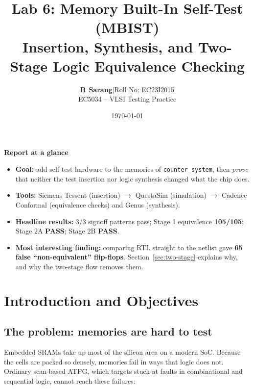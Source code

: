 \documentclass[11pt]{article}
\title{\vspace{-1em}\textbf{\color{navy}Lab 6: Memory Built-In Self-Test (MBIST)}\\[2pt]
\large Insertion, Synthesis, and Two-Stage Logic Equivalence Checking}
\author{\textbf{R Sarang}\quad|\quad Roll No: EC23I2015\\
        EC5034 -- VLSI Testing Practice}
\date{\today}
\newcommand{\code}[1]{\texttt{\small #1}}
\begin{document}
\maketitle
\vspace{-1.2em}

\begin{tcolorbox}[enhanced, colback=paper, colframe=navy!40, boxrule=0.5pt, arc=2pt]
\textbf{Report at a glance}
\begin{itemize}[leftmargin=1.4em, itemsep=1pt]
  \item \textbf{Goal:} add self-test hardware to the memories of \code{counter\_system}, then \emph{prove}
        that neither the test insertion nor logic synthesis changed what the chip does.
  \item \textbf{Tools:} Siemens Tessent (insertion) $\rightarrow$ QuestaSim (simulation) $\rightarrow$
        Cadence Conformal (equivalence checks) and Genus (synthesis).
  \item \textbf{Headline results:} 3/3 signoff patterns pass; Stage 1 equivalence \textbf{105/105};
        Stage 2A \textbf{PASS}; Stage 2B \textbf{PASS}.
  \item \textbf{Most interesting finding:} comparing RTL straight to the netlist gave
        \textbf{65 false ``non-equivalent'' flip-flops}. Section~\ref{sec:two-stage} explains why, and why
        the two-stage flow removes them.
\end{itemize}
\end{tcolorbox}

\tableofcontents
\newpage

\section{Introduction and Objectives}

\subsection{The problem: memories are hard to test}
Embedded SRAMs take up most of the silicon area on a modern SoC. Because the cells are packed so
densely, memories fail in ways that logic does not. Ordinary scan-based ATPG, which targets
stuck-at faults in combinational and sequential logic, cannot reach these failures:
\end{document}
